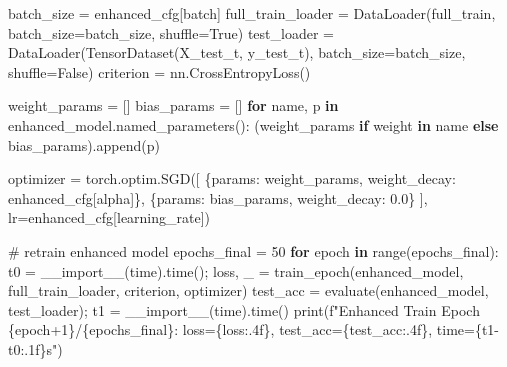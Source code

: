 \documentclass[
  letterpaper,
  DIV=11,
  numbers=noendperiod]{scrartcl}
\newenvironment{Shaded}{\begin{snugshade}}{\end{snugshade}}
\newcommand{\BuiltInTok}[1]{\textcolor[rgb]{0.00,0.23,0.31}{#1}}
\newcommand{\CommentTok}[1]{\textcolor[rgb]{0.37,0.37,0.37}{#1}}
\newcommand{\ControlFlowTok}[1]{\textcolor[rgb]{0.00,0.23,0.31}{\textbf{#1}}}
\newcommand{\DecValTok}[1]{\textcolor[rgb]{0.68,0.00,0.00}{#1}}
\newcommand{\FloatTok}[1]{\textcolor[rgb]{0.68,0.00,0.00}{#1}}
\newcommand{\KeywordTok}[1]{\textcolor[rgb]{0.00,0.23,0.31}{\textbf{#1}}}
\newcommand{\NormalTok}[1]{\textcolor[rgb]{0.00,0.23,0.31}{#1}}
\newcommand{\OperatorTok}[1]{\textcolor[rgb]{0.37,0.37,0.37}{#1}}
\newcommand{\SpecialCharTok}[1]{\textcolor[rgb]{0.37,0.37,0.37}{#1}}
\newcommand{\SpecialStringTok}[1]{\textcolor[rgb]{0.13,0.47,0.30}{#1}}
\newcommand{\StringTok}[1]{\textcolor[rgb]{0.13,0.47,0.30}{#1}}
\newcommand{\VariableTok}[1]{\textcolor[rgb]{0.07,0.07,0.07}{#1}}
\begin{document}
\begin{Shaded}
\begin{Highlighting}[]
\NormalTok{batch\_size }\OperatorTok{=}\NormalTok{ enhanced\_cfg[}\StringTok{\textquotesingle{}batch\textquotesingle{}}\NormalTok{]}
\NormalTok{full\_train\_loader }\OperatorTok{=}\NormalTok{ DataLoader(full\_train, batch\_size}\OperatorTok{=}\NormalTok{batch\_size, shuffle}\OperatorTok{=}\VariableTok{True}\NormalTok{)}
\NormalTok{test\_loader }\OperatorTok{=}\NormalTok{ DataLoader(TensorDataset(X\_test\_t, y\_test\_t), batch\_size}\OperatorTok{=}\NormalTok{batch\_size, shuffle}\OperatorTok{=}\VariableTok{False}\NormalTok{)}
\NormalTok{criterion }\OperatorTok{=}\NormalTok{ nn.CrossEntropyLoss()}

\NormalTok{weight\_params }\OperatorTok{=}\NormalTok{ []}
\NormalTok{bias\_params }\OperatorTok{=}\NormalTok{ []}
\ControlFlowTok{for}\NormalTok{ name, p }\KeywordTok{in}\NormalTok{ enhanced\_model.named\_parameters():}
\NormalTok{    (weight\_params }\ControlFlowTok{if} \StringTok{\textquotesingle{}weight\textquotesingle{}} \KeywordTok{in}\NormalTok{ name }\ControlFlowTok{else}\NormalTok{ bias\_params).append(p)}

\NormalTok{optimizer }\OperatorTok{=}\NormalTok{ torch.optim.SGD([}
\NormalTok{    \{}\StringTok{\textquotesingle{}params\textquotesingle{}}\NormalTok{: weight\_params, }\StringTok{\textquotesingle{}weight\_decay\textquotesingle{}}\NormalTok{: enhanced\_cfg[}\StringTok{\textquotesingle{}alpha\textquotesingle{}}\NormalTok{]\},}
\NormalTok{    \{}\StringTok{\textquotesingle{}params\textquotesingle{}}\NormalTok{: bias\_params, }\StringTok{\textquotesingle{}weight\_decay\textquotesingle{}}\NormalTok{: }\FloatTok{0.0}\NormalTok{\}}
\NormalTok{], lr}\OperatorTok{=}\NormalTok{enhanced\_cfg[}\StringTok{\textquotesingle{}learning\_rate\textquotesingle{}}\NormalTok{])}

\CommentTok{\# retrain enhanced model}
\NormalTok{epochs\_final }\OperatorTok{=} \DecValTok{50}
\ControlFlowTok{for}\NormalTok{ epoch }\KeywordTok{in} \BuiltInTok{range}\NormalTok{(epochs\_final):}
\NormalTok{    t0 }\OperatorTok{=} \BuiltInTok{\_\_import\_\_}\NormalTok{(}\StringTok{\textquotesingle{}time\textquotesingle{}}\NormalTok{).time()}\OperatorTok{;}\NormalTok{ loss, \_ }\OperatorTok{=}\NormalTok{ train\_epoch(enhanced\_model, full\_train\_loader, criterion, optimizer)}
\NormalTok{    test\_acc }\OperatorTok{=}\NormalTok{ evaluate(enhanced\_model, test\_loader)}\OperatorTok{;}\NormalTok{ t1 }\OperatorTok{=} \BuiltInTok{\_\_import\_\_}\NormalTok{(}\StringTok{\textquotesingle{}time\textquotesingle{}}\NormalTok{).time()}
    \BuiltInTok{print}\NormalTok{(}\SpecialStringTok{f"Enhanced Train Epoch }\SpecialCharTok{\{}\NormalTok{epoch}\OperatorTok{+}\DecValTok{1}\SpecialCharTok{\}}\SpecialStringTok{/}\SpecialCharTok{\{}\NormalTok{epochs\_final}\SpecialCharTok{\}}\SpecialStringTok{: loss=}\SpecialCharTok{\{}\NormalTok{loss}\SpecialCharTok{:.4f\}}\SpecialStringTok{, test\_acc=}\SpecialCharTok{\{}\NormalTok{test\_acc}\SpecialCharTok{:.4f\}}\SpecialStringTok{, time=}\SpecialCharTok{\{}\NormalTok{t1}\OperatorTok{{-}}\NormalTok{t0}\SpecialCharTok{:.1f\}}\SpecialStringTok{s"}\NormalTok{)}


\end{Highlighting}
\end{Shaded}
\end{document}
